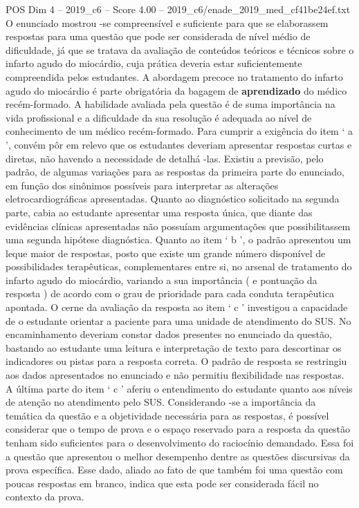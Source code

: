 \begin{textsample}{POS Dim 4 – 2019\_c6 – Score 4.00 – 2019\_c6/enade\_2019\_med\_cf41be24ef.txt}
O enunciado mostrou -se compreensível e suficiente para que se elaborassem respostas para uma questão que pode ser considerada de nível médio de dificuldade, já que se tratava da avaliação de conteúdos teóricos e técnicos sobre o infarto agudo do miocárdio, cuja prática deveria estar suficientemente compreendida pelos estudantes.
A abordagem precoce no tratamento do infarto agudo do miocárdio é parte obrigatória da bagagem de \textbf{aprendizado} do médico recém-formado.
A habilidade avaliada pela questão é de suma importância na vida profissional e a dificuldade da sua resolução é adequada ao nível de conhecimento de um médico recém-formado.
Para cumprir a exigência do item ‘ a ’, convém pôr em relevo que os estudantes deveriam apresentar respostas curtas e diretas, não havendo a necessidade de detalhá -las.
Existiu a previsão, pelo padrão, de algumas variações para as respostas da primeira parte do enunciado, em função dos sinônimos possíveis para interpretar as alterações eletrocardiográficas apresentadas.
Quanto ao diagnóstico solicitado na segunda parte, cabia ao estudante apresentar uma resposta única, que diante das evidências clínicas apresentadas não possuíam argumentações que possibilitassem uma segunda hipótese diagnóstica.
Quanto ao item ‘ b ’, o padrão apresentou um leque maior de respostas, posto que existe um grande número disponível de possibilidades terapêuticas, complementares entre si, no arsenal de tratamento do infarto agudo do miocárdio, variando a sua importância ( e pontuação da resposta ) de acordo com o grau de prioridade para cada conduta terapêutica apontada.
O cerne da avaliação da resposta ao item ‘ c ’ investigou a capacidade de o estudante orientar a paciente para uma unidade de atendimento do SUS.
No encaminhamento deveriam constar dados presentes no enunciado da questão, bastando ao estudante uma leitura e interpretação de texto para descortinar os indicadores ou pistas para a resposta correta.
O padrão de resposta se restringiu aos dados apresentados no enunciado e não permitiu flexibilidade nas respostas.
A última parte do item ‘ c ’ aferiu o entendimento do estudante quanto aos níveis de atenção no atendimento pelo SUS.
Considerando -se a importância da temática da questão e a objetividade necessária para as respostas, é possível considerar que o tempo de prova e o espaço reservado para a resposta da questão tenham sido suficientes para o desenvolvimento do raciocínio demandado.
Essa foi a questão que apresentou o melhor desempenho dentre as questões discursivas da prova específica.
Esse dado, aliado ao fato de que também foi uma questão com poucas respostas em branco, indica que esta pode ser considerada fácil no contexto da prova.

\end{textsample}

